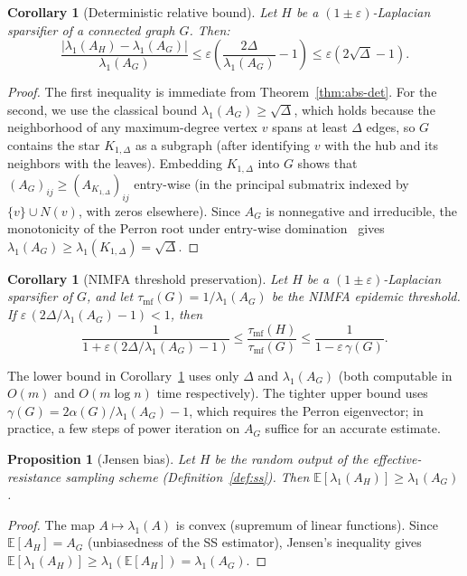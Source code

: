 \documentclass[11pt]{article}
\newtheorem{proposition}[theorem]{Proposition}
\newtheorem{corollary}[theorem]{Corollary}
\theoremstyle{definition}
\newcommand{\eps}{\varepsilon}
\newcommand{\lamH}{\lambda_1(A_H)}
\newcommand{\lamG}{\lambda_1(A_G)}
\newcommand{\AG}{A_G}
\newcommand{\AH}{A_H}
\newcommand{\E}{\mathbb{E}}
\begin{document}
\begin{corollary}[Deterministic relative bound]\label{cor:relative}
Let $H$ be a $(1\pm\eps)$-Laplacian sparsifier of a connected graph $G$. Then:
\[
\frac{|\lamH - \lamG|}{\lamG} \leq \eps\!\left(\frac{2\Delta}{\lamG} - 1\right)
\leq \eps\!\left(2\sqrt{\Delta} - 1\right).
\]
\end{corollary}
\begin{proof}
The first inequality is immediate from Theorem~\ref{thm:abs-det}.
For the second, we use the classical bound $\lamG \geq \sqrt{\Delta}$, which holds
because the neighborhood of any maximum-degree vertex $v$ spans at least $\Delta$
edges, so $G$ contains the star $K_{1,\Delta}$ as a subgraph (after identifying $v$
with the hub and its neighbors with the leaves). Embedding $K_{1,\Delta}$ into $G$
shows that $(\AG)_{ij} \geq (A_{K_{1,\Delta}})_{ij}$ entry-wise (in the principal
submatrix indexed by $\{v\} \cup N(v)$, with zeros elsewhere). Since $\AG$ is
nonneg\-ative and irreducible, the monotonicity of the Perron root under entry-wise
domination~\citep[Corollary~8.1.19]{horn2012matrix} gives
$\lamG \geq \lambda_1(K_{1,\Delta}) = \sqrt{\Delta}$.
\end{proof}

\begin{corollary}[NIMFA threshold preservation]\label{cor:epidemic}
Let $H$ be a $(1\pm\eps)$-Laplacian sparsifier of $G$, and let
$\tau_{\mathrm{mf}}(G) = 1/\lamG$ be the NIMFA epidemic threshold.
If $\eps\,(2\Delta/\lamG - 1) < 1$, then
\[
\frac{1}{1 + \eps(2\Delta/\lamG - 1)}
\leq \frac{\tau_{\mathrm{mf}}(H)}{\tau_{\mathrm{mf}}(G)}
\leq \frac{1}{1 - \eps\,\gamma(G)}.
\]
\end{corollary}

The lower bound in Corollary~\ref{cor:epidemic} uses only $\Delta$ and $\lamG$ (both
computable in $O(m)$ and $O(m\log n)$ time respectively). The tighter upper bound
uses $\gamma(G) = 2\alpha(G)/\lamG - 1$, which requires the Perron eigenvector; in
practice, a few steps of power iteration on $\AG$ suffice for an accurate estimate.

\begin{proposition}[Jensen bias]\label{thm:jensen}
Let $H$ be the random output of the effective-resistance sampling scheme
(Definition~\ref{def:ss}). Then $\E[\lamH] \geq \lamG$.
\end{proposition}
\begin{proof}
The map $A \mapsto \lambda_1(A)$ is convex (supremum of linear functions).
Since $\E[\AH] = \AG$ (unbiasedness of the SS estimator), Jensen's inequality gives
$\E[\lamH] \geq \lambda_1(\E[\AH]) = \lamG$.
\end{proof}
\end{document}

